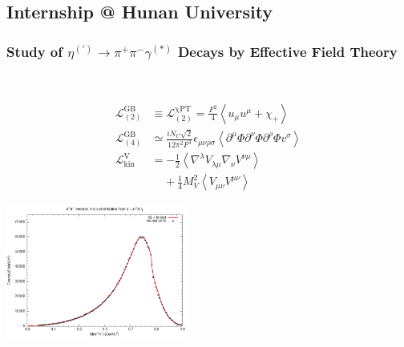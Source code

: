 \documentclass[9pt]{beamer}
\newcommand{\fives}{\ \ \ \ \ }
\newcommand{\ssc}{\subsection}
\newcommand{\agn}[1]{\begin{align} #1 \end{align}}
\begin{document}
\ssc{Internship @ Hunan University}
\begin{frame}[noframenumbering]
\frametitle{Study of $\eta^{(\prime)} \to \pi^+ \pi^- \gamma^{(\ast)}$ Decays by Effective Field Theory}

\begin{figure}[htbp]
	\centering
	 \qquad
	 \qquad
	 \\%
	 \qquad
		\qquad
\end{figure}


\begin{minipage}{0.45\linewidth}
$$ \agn{
\mathcal{L}^\mathrm{GB}_{(2)} &\equiv \mathcal{L}^\mathrm{\chi PT}_{(2)} = \frac{F^2}{4} \left\langle u_\mu u^\mu + \chi_+ \right\rangle \\
\mathcal{L}^\mathrm{GB}_{(4)} &\simeq \frac{i N_C \sqrt{2}}{12 \pi^2 F^3} \epsilon_{\mu\nu\rho\sigma} \left\langle \partial^\mu \Phi \partial^\nu \Phi \partial^\rho \Phi v^\sigma \right\rangle \\ %
\mathcal{L}^\mathrm{V}_\mathrm{kin} &= - \frac{1}{2} \left\langle \nabla^\lambda V_{\lambda\mu} \nabla_\nu V^{\nu\mu} \right\rangle \\ &\fives + \frac{1}{4} M_V^2 \left\langle V_{\mu\nu} V^{\mu\nu} \right\rangle
} $$

\end{minipage}
\begin{minipage}{0.54\linewidth}
	\begin{center}
		\includegraphics[width = 6cm]{figs/spec_pp18_290.png}
	\end{center}
\end{minipage}


\end{frame}
\end{document}

